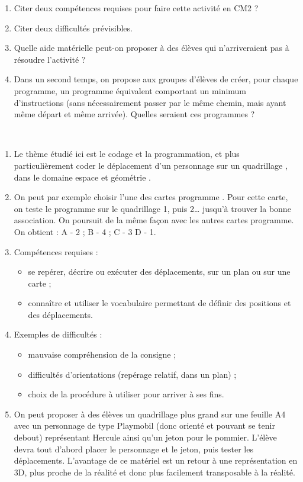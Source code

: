 \begin{exercice}[Programmation]
\begin{enumerate}
   \item Citer deux compétences requises pour faire cette activité en CM2 ?
   \item Citer deux difficultés prévisibles.
   \item Quelle aide matérielle peut-on proposer à des élèves qui n'arriveraient pas à résoudre l'activité ?
   \item Dans un second temps, on propose aux groupes d'élèves de créer, pour chaque programme, un programme équivalent comportant un minimum d'instructions (sans nécessairement passer par le même chemin, mais ayant même départ et même arrivée). Quelles seraient ces programmes ?
\end{enumerate}
\end{exercice}

\begin{corrige}
\ \\ [-5mm]
\begin{enumerate}
   \item Le thème étudié ici est le codage et la programmation, et plus particulièrement \og coder le déplacement d'un personnage sur un quadrillage \fg{}, dans le domaine \og espace et géométrie \fg.
   \item On peut par exemple choisir l'une des cartes \og programme \fg{}. Pour cette carte, on teste le programme sur le quadrillage 1, puis 2\dots {} jusqu'à trouver la bonne association. On poursuit de la même façon avec les autres cartes programme. On obtient : A - 2 \quad ; \quad B - 4 \quad ; \quad C - 3 \quad D - 1.
   \item Compétences requises :
   \begin{itemize}
      \item se repérer, décrire ou exécuter des déplacements, sur un
plan ou sur une carte ;
      \item connaître et utiliser le vocabulaire permettant de définir des
positions et des déplacements.
   \end{itemize}
   \item Exemples de difficultés :
   \begin{itemize}
      \item mauvaise compréhension de la consigne ;
      \item difficultés d'orientations (repérage relatif, dans un plan) ;
      \item choix de la procédure à utiliser pour arriver à ses fins.
   \end{itemize}
   \item On peut proposer à des élèves un quadrillage plus grand sur une feuille A4 avec un personnage de type Playmobil (donc orienté et pouvant se tenir debout) représentant Hercule ainsi qu'un jeton pour le pommier. L'élève devra tout d'abord placer le personnage et le jeton, puis tester les déplacements. L'avantage de ce matériel est un retour à une représentation en 3D, plus proche de la réalité et donc plus facilement transposable à la réalité. \\

\end{enumerate}
\end{corrige}
